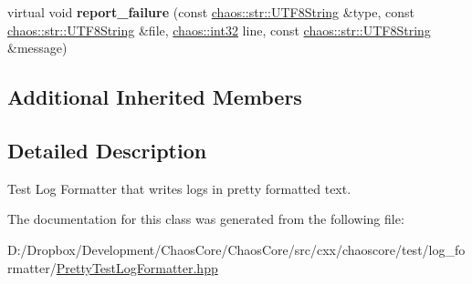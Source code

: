 \begin{DoxyCompactItemize}
\item 
\hypertarget{classchaos_1_1test_1_1log__formatter_1_1_pretty_test_log_formatter_ab0bc855628912476da5a4c9eba970ee1}{}virtual void {\bfseries report\+\_\+failure} (const \hyperlink{classchaos_1_1str_1_1_u_t_f8_string}{chaos\+::str\+::\+U\+T\+F8\+String} \&type, const \hyperlink{classchaos_1_1str_1_1_u_t_f8_string}{chaos\+::str\+::\+U\+T\+F8\+String} \&file, \hyperlink{namespacechaos_ad1de7efb430365afd2c9446a0f522a90}{chaos\+::int32} line, const \hyperlink{classchaos_1_1str_1_1_u_t_f8_string}{chaos\+::str\+::\+U\+T\+F8\+String} \&message)\label{classchaos_1_1test_1_1log__formatter_1_1_pretty_test_log_formatter_ab0bc855628912476da5a4c9eba970ee1}

\end{DoxyCompactItemize}
\subsection*{Additional Inherited Members}


\subsection{Detailed Description}
Test Log Formatter that writes logs in pretty formatted text. 

The documentation for this class was generated from the following file\+:\begin{DoxyCompactItemize}
\item 
D\+:/\+Dropbox/\+Development/\+Chaos\+Core/\+Chaos\+Core/src/cxx/chaoscore/test/log\+\_\+formatter/\hyperlink{_pretty_test_log_formatter_8hpp}{Pretty\+Test\+Log\+Formatter.\+hpp}\end{DoxyCompactItemize}
